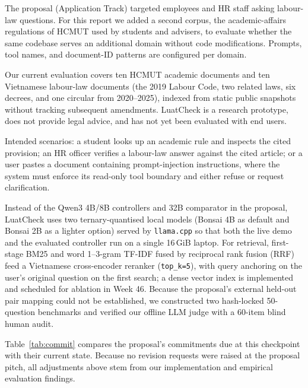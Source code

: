 The proposal (Application Track) targeted employees and HR staff asking labour-law questions. For this report we added a second corpus, the academic-affairs regulations of HCMUT used by students and advisers, to evaluate whether the same codebase serves an additional domain without code modifications. Prompts, tool names, and document-ID patterns are configured per domain.

Our current evaluation covers ten HCMUT academic documents and ten Vietnamese labour-law documents (the 2019 Labour Code, two related laws, six decrees, and one circular from 2020--2025), indexed from static public snapshots without tracking subsequent amendments. LuatCheck is a research prototype, does not provide legal advice, and has not yet been evaluated with end users.

Intended scenarios: a student looks up an academic rule and inspects the cited provision; an HR officer verifies a labour-law answer against the cited article; or a user pastes a document containing prompt-injection instructions, where the system must enforce its read-only tool boundary and either refuse or request clarification.

 Instead of the Qwen3 4B/8B controllers and 32B comparator in the proposal, LuatCheck uses two ternary-quantised local models (Bonsai 4B as default and Bonsai 2B as a lighter option) served by \texttt{llama.cpp} so that both the live demo and the evaluated controller run on a single 16\,GiB laptop. For retrieval, first-stage BM25 and word 1--3-gram TF-IDF fused by reciprocal rank fusion (RRF) feed a Vietnamese cross-encoder reranker (\texttt{top\_k=5}), with query anchoring on the user's original question on the first search; a dense vector index is implemented and scheduled for ablation in Week 46. Because the proposal's external held-out pair mapping could not be established, we constructed two hash-locked 50-question benchmarks and verified our offline LLM judge with a 60-item blind human audit.

 Table~\ref{tab:commit} compares the proposal's commitments due at this checkpoint with their current state. Because no revision requests were raised at the proposal pitch, all adjustments above stem from our implementation and empirical evaluation findings.

